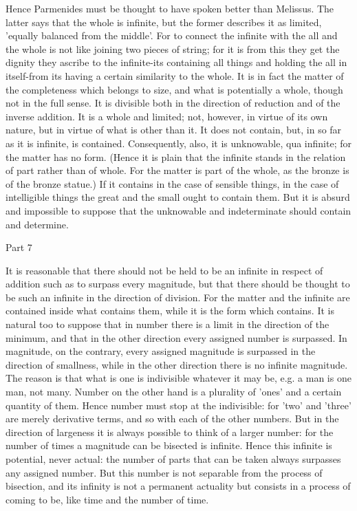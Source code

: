 Hence Parmenides must be thought to have spoken better than Melissus.
The latter says that the whole is infinite, but the former describes
it as limited, 'equally balanced from the middle'. For to connect
the infinite with the all and the whole is not like joining two pieces
of string; for it is from this they get the dignity they ascribe to
the infinite-its containing all things and holding the all in itself-from
its having a certain similarity to the whole. It is in fact the matter
of the completeness which belongs to size, and what is potentially
a whole, though not in the full sense. It is divisible both in the
direction of reduction and of the inverse addition. It is a whole
and limited; not, however, in virtue of its own nature, but in virtue
of what is other than it. It does not contain, but, in so far as it
is infinite, is contained. Consequently, also, it is unknowable, qua
infinite; for the matter has no form. (Hence it is plain that the
infinite stands in the relation of part rather than of whole. For
the matter is part of the whole, as the bronze is of the bronze statue.)
If it contains in the case of sensible things, in the case of intelligible
things the great and the small ought to contain them. But it is absurd
and impossible to suppose that the unknowable and indeterminate should
contain and determine. 

Part 7

It is reasonable that there should not be held to be an infinite in
respect of addition such as to surpass every magnitude, but that there
should be thought to be such an infinite in the direction of division.
For the matter and the infinite are contained inside what contains
them, while it is the form which contains. It is natural too to suppose
that in number there is a limit in the direction of the minimum, and
that in the other direction every assigned number is surpassed. In
magnitude, on the contrary, every assigned magnitude is surpassed
in the direction of smallness, while in the other direction there
is no infinite magnitude. The reason is that what is one is indivisible
whatever it may be, e.g. a man is one man, not many. Number on the
other hand is a plurality of 'ones' and a certain quantity of them.
Hence number must stop at the indivisible: for 'two' and 'three' are
merely derivative terms, and so with each of the other numbers. But
in the direction of largeness it is always possible to think of a
larger number: for the number of times a magnitude can be bisected
is infinite. Hence this infinite is potential, never actual: the number
of parts that can be taken always surpasses any assigned number. But
this number is not separable from the process of bisection, and its
infinity is not a permanent actuality but consists in a process of
coming to be, like time and the number of time. 

